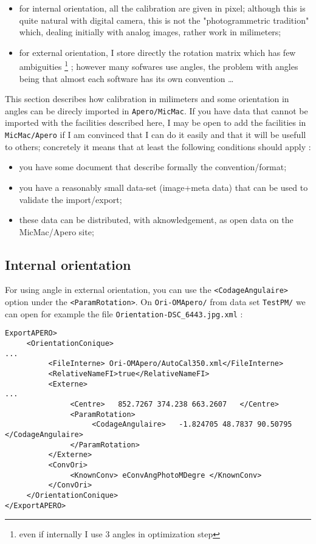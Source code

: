 \begin{itemize}
    \item for internal orientation, all the calibration are given in pixel;
          although this is quite natural with digital camera, this is
          not the "photogrammetric tradition" which, dealing initially with
          analog images, rather work in milimeters;

    \item for external orientation, I store directly the rotation matrix which
          has few ambiguities \footnote{even if internally I use $3$ angles in 
          optimization step} ; however many sofwares use angles, the problem
          with angles being that almost each software has its own convention \dots
\end{itemize}

This section describes how calibration in milimeters and some orientation in angles
can be direcly imported in {\tt Apero/MicMac}. If you have data that cannot be
imported with the facilities described here, I may be open to add the facilities in
{\tt MicMac/Apero} if I am convinced that I can do it easily and that it will 
be usefull to others; concretely it means that at least the following conditions should apply :

\begin{itemize}
      \item  you have some document that describe formally the convention/format;
      \item  you have a reasonably small data-set (image+meta data) that can  be used
             to validate the import/export;
      \item  these data can be distributed, with aknowledgement, as open data on the 
             MicMac/Apero site;
\end{itemize}

\subsection{Internal orientation}

For using angle in external orientation, you can use the {\tt  <CodageAngulaire> }
option under the {\tt <ParamRotation>}. On {\tt Ori-OMApero/} from data set
{\tt TestPM/} we can open for example the file {\tt Orientation-DSC\_6443.jpg.xml} :

\begin{verbatim}
ExportAPERO>
     <OrientationConique>
...
          <FileInterne> Ori-OMApero/AutoCal350.xml</FileInterne>
          <RelativeNameFI>true</RelativeNameFI>
          <Externe>
...
               <Centre>   852.7267 374.238 663.2607   </Centre>
               <ParamRotation>
                    <CodageAngulaire>   -1.824705 48.7837 90.50795 </CodageAngulaire>
               </ParamRotation>
          </Externe>
          <ConvOri>
               <KnownConv> eConvAngPhotoMDegre </KnownConv>
          </ConvOri>
     </OrientationConique>
</ExportAPERO>

\end{verbatim}


